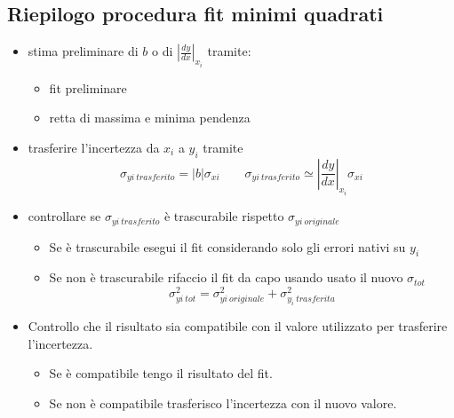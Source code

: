 \documentclass[11pt,a4paper]{book}
\begin{document}
\subsection{Riepilogo procedura fit minimi quadrati} 
\begin{itemize}
\item stima preliminare di $ b $ o di  $ \left| \frac{dy}{dx} \right|_{x_i} $ tramite:
\begin{itemize}
\item fit preliminare
\item retta di massima e minima pendenza
\end{itemize}
\item trasferire l'incertezza da $ x_i $ a $ y_i $ tramite
\begin{equation}
\sigma_{yi \ trasferito } = |b|\sigma_{xi} \qquad \sigma_{yi \ trasferito } \simeq \left| \frac{dy}{dx} \right|_{x_i} \sigma_{xi}
\end{equation}
\item controllare se $ \sigma_{yi \ trasferito} $ è trascurabile rispetto $ \sigma_{yi \ originale} $
\begin{itemize}
\item Se è trascurabile esegui il fit considerando solo gli errori nativi su $ y_i $
\item Se non è trascurabile rifaccio il fit da capo usando usato il nuovo $ \sigma_{tot}  $
\begin{equation}
\sigma_{yi \ tot}^2 = \sigma_{yi\ originale}^2 + \sigma_{y_i \ trasferita}^2
\end{equation}
\end{itemize}
\item Controllo che il risultato sia compatibile con il valore utilizzato per trasferire l'incertezza.
\begin{itemize}
\item Se è compatibile tengo il risultato del fit.
\item Se non è compatibile trasferisco l'incertezza con il nuovo valore.
\end{itemize}
\end{itemize}
\end{document}
